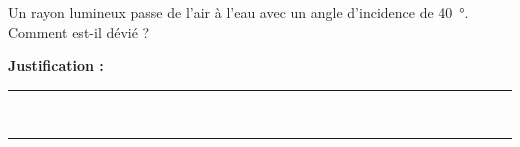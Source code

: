 Un rayon lumineux passe de l'air à l'eau avec un angle d'incidence de \qty{40}{\degree}. Comment est-il dévié ?

\choices

\noindent\textbf{Justification :} \hrulefill \\[2.5ex]
\rule{\linewidth}{0.4pt} \\[2.5ex]
\rule{\linewidth}{0.4pt}
\vfill
